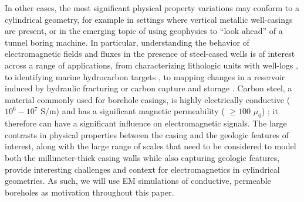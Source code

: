 \documentclass[preprint,review,3p,times,onecolumn,authoryear]{elsarticle}
\begin{document}
In other cases, the most significant physical property variations may conform to a cylindrical geometry, for example in settings where vertical metallic well-casings are present, or in the emerging topic of using geophysics to ``look ahead'' of a tunnel boring machine. In particular, understanding the behavior of electromagnetic fields and fluxes in the presence of steel-cased wells is of interest across a range of applications, from characterizing lithologic units with well-logs \citep{Kaufman1990, Kaufman1993, Augustin1989}, to identifying marine hydrocarbon targets \citep{Kong2009, Swidinsky2013, Tietze2015}, to mapping changes in a reservoir induced by hydraulic fracturing or carbon capture and storage \citep{Pardo2013, Borner2015, Um2015, Weiss2016, hoversten2017borehole, Zhang2018}. Carbon steel, a material commonly used for borehole casings, is highly electrically conductive ($10^6 - 10^7$ S/m) and has a significant magnetic permeability ( $\geq 100$ $\mu_0$) \citep{wuhabashy1994}; it therefore can have a significant influence on electromagnetic signals. The large contrasts in physical properties between the casing and the geologic features of interest, along with the large range of scales that need to be considered to model both the millimeter-thick casing walls while also capturing geologic features, provide interesting challenges and context for electromagnetics in cylindrical geometries. As such, we will use EM simulations of conductive, permeable boreholes as motivation throughout this paper.
\end{document}
